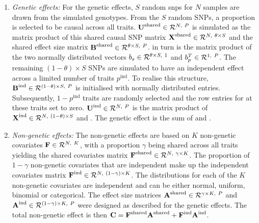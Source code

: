 %
\begin{enumerate}
\item \textit{Genetic effects:} For the genetic effects, \(S\) random \glspl{snp} for \(N\) samples are drawn from the simulated genotypes. From the \(S\) random SNPs, a proportion \tmat{\theta} is selected to be causal across all traits. \(\boldsymbol{\mathbf{U}}^\text{shared}\in \mathcal{R}^{N,~P}\) is simulated as the matrix product of this shared causal SNP matrix \(\boldsymbol{\mathbf{X}}^\text{shared}\in \mathcal{R}^{N,~\theta \times S}\) and the shared effect size matrix \(\boldsymbol{\mathbf{B}}^\text{shared} \in \mathcal{R}^{\theta  \times S,~P}\).  in turn is the matrix product of the two normally distributed vectors \(b_s \in \mathcal{R}^{\theta  \times S,~1}\) and \(b_p^T \in \mathcal{R}^{1,~P}\). The remaining \((1- \theta ) \times S\) SNPs are simulated to have an independent effect across a limited number of traits \(p^{\text{ind}}\). To realise this structure, \(\boldsymbol{\mathbf{B}}^\text{ind} \in \mathcal{R}^{(1-\theta) \times S,~P}\) is initialised with normally distributed entries. Subsequently, \(1 - p^{\text{ind}}\) traits are randomly selected and the row entries for  at these traits set to zero. \(\boldsymbol{\mathbf{U}}^\text{ind} \in \mathcal{R}^{N,~P}\) is the matrix product of \(\boldsymbol{\mathbf{X}}^\text{ind} \in \mathcal{R}^{N,~(1 - \theta)  \times S}\) and .
The genetic effect  is the sum of  and .

\item \textit{Non-genetic effects:} The non-genetic effects  are based on \(K\) non-genetic covariates \(\boldsymbol{\mathbf{F}} \in \mathcal{R}^{N,~K}\), with a proportion \(\gamma\) being shared across all traits yielding the shared covariates matrix \(\boldsymbol{\mathbf{F}}^\text{shared} \in \mathcal{R}^{N,~\gamma \times K} \). The proportion of \(1- \gamma\) non-genetic covariates that are independent make up the independent covariates matrix \(\boldsymbol{\mathbf{F}}^\text{ind} \in \mathcal{R}^{N,~(1-\gamma) \times K}\). The distributions for each of the \(K\)  non-genetic covariates are independent and can be either normal, uniform, binomial or categorical.  The effect size matrices  \(\boldsymbol{\mathbf{A}}^\text{shared} \in \mathcal{R}^{\gamma \times K,~P}\)  and \(\boldsymbol{\mathbf{A}}^\text{ind}  \in \mathcal{R}^{(1-\gamma) \times K,~P} \) were designed as described for the genetic effects. The total non-genetic effect is then \(\boldsymbol{\mathbf{C}} =  \boldsymbol{\mathbf{F}}^\text{shared} \boldsymbol{\mathbf{A}}^\text{shared} + \boldsymbol{\mathbf{F}}^\text{ind}  \boldsymbol{\mathbf{A}}^\text{ind} \).


\end{enumerate}

